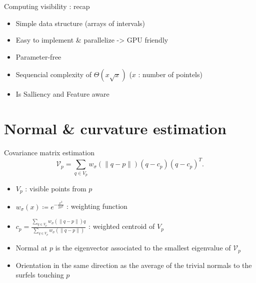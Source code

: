 \documentclass[11pt]{beamer}
\begin{document}
    \begin{frame}{Computing visibility : recap}
        \begin{itemize}
            \item Simple data structure (arrays of intervals)
            \item Easy to implement \& parallelize -> GPU friendly
            \item Parameter-free
            \item Sequencial complexity of $\Theta \left(x \sqrt{x}\right)$ ($x$ : number of pointels)
            \item Is Salliency and Feature aware
        \end{itemize}
    \end{frame}


    \section{Normal \& curvature estimation}
    \begin{frame}{Covariance matrix estimation}
        \newcommand{\Kernel}[1]{\ensuremath{w_{\sigma}(#1)}}
        \begin{equation}
            \mathcal{V}_p = \sum_{q \in V_p} \Kernel{\|q-p\|}(q - c_p)(q - c_p)^T.
        \end{equation}
        \begin{itemize}
            \item $V_p$ : visible points from $p$
            \item $\Kernel{x}\coloneqq e^{-\frac{x^2}{2\sigma^2}}$ : weighting function
            \item $c_p = \frac{\sum_{q \in V_p} \Kernel{\|q-p\|} q}{\sum_{q \in V_p} \Kernel{\|q-p\|}}$ : weighted centroid of $V_p$
            \item Normal at $p$ is the eigenvector associated to the smallest eigenvalue of $\mathcal{V}_p$
            \item Orientation in the same direction as the average of the trivial normals to the surfels touching $p$
        \end{itemize}
    \end{frame}
\end{document}
